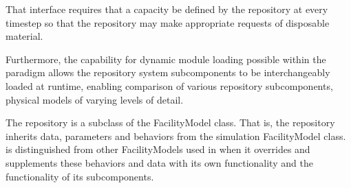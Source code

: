 That interface requires that a capacity be defined by the repository at every 
\Cyclus timestep so that the repository may make appropriate requests of 
disposable material.

Furthermore, the capability for dynamic module loading possible within 
the \Cyclus paradigm allows the repository system subcomponents to be 
interchangeably loaded at runtime, enabling comparison of various 
repository subcomponents, physical models of varying levels of detail. 

The \Cyder repository is a subclass of the FacilityModel class.  That is, the 
repository inherits data, parameters and behaviors from the \Cyclus simulation 
FacilityModel class. \Cyder is distinguished from other FacilityModels used in 
\Cyclus when it overrides and supplements these behaviors and data with its own 
functionality and the functionality of its subcomponents.




